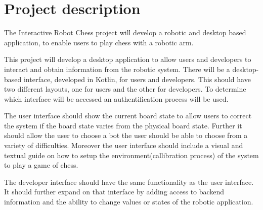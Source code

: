 \documentclass[11pt,fleqn,twoside]{article}
\begin{document}

\mmp

\setcounter{tocdepth}{4} %


\section{Project description}
The Interactive Robot Chess project will develop a robotic and desktop based application, to enable users to 
play chess with a robotic arm.\newline

\noindent This project will develop a desktop application to allow users and developers to interact and obtain 
information from the robotic system. There will be a desktop-based interface, developed in Kotlin\cite{kotlin}, for users 
and developers. This should have two different layouts, one for users and the other for developers. To determine   
which interface will be accessed an authentification process will be used.\newline

\noindent The user interface should show the current board state to allow users to correct the system if the board 
state varies from the physical board state. Further it should allow the user to choose a bot the user should be able 
to choose from a variety of difficulties. Moreover the user interface should include a visual and textual guide on 
how to setup the environment(callibration process) of the system to play a game of chess.\newline

\noindent The developer interface should have the same functionality as the user interface. It should further expand 
on that interface by adding access to backend information and the ability to change values or states of the robotic 
application.\newline
\end{document}
